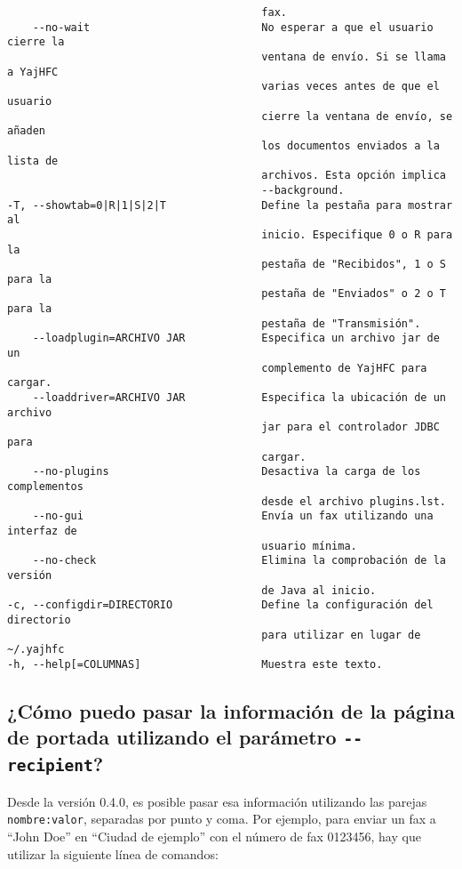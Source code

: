 \documentclass[a4paper,10pt]{scrartcl}
\begin{document}
\begin{verbatim}
                                        fax.
    --no-wait                           No esperar a que el usuario cierre la
                                        ventana de envío. Si se llama a YajHFC
                                        varias veces antes de que el usuario
                                        cierre la ventana de envío, se añaden
                                        los documentos enviados a la lista de
                                        archivos. Esta opción implica
                                        --background.
-T, --showtab=0|R|1|S|2|T               Define la pestaña para mostrar al
                                        inicio. Especifique 0 o R para la
                                        pestaña de "Recibidos", 1 o S para la
                                        pestaña de "Enviados" o 2 o T para la
                                        pestaña de "Transmisión".
    --loadplugin=ARCHIVO JAR            Especifica un archivo jar de un
                                        complemento de YajHFC para cargar.
    --loaddriver=ARCHIVO JAR            Especifica la ubicación de un archivo
                                        jar para el controlador JDBC para
                                        cargar.
    --no-plugins                        Desactiva la carga de los complementos
                                        desde el archivo plugins.lst.
    --no-gui                            Envía un fax utilizando una interfaz de
                                        usuario mínima.
    --no-check                          Elimina la comprobación de la versión
                                        de Java al inicio.
-c, --configdir=DIRECTORIO              Define la configuración del directorio
                                        para utilizar en lugar de ~/.yajhfc
-h, --help[=COLUMNAS]                   Muestra este texto.
\end{verbatim}

\subsection{¿Cómo puedo pasar la información de la página de portada utilizando el parámetro \texttt{-{-}recipient}?}

Desde la versión 0.4.0, es posible pasar esa información utilizando las parejas \texttt{nombre:valor}, separadas por punto y coma. Por ejemplo, para enviar un fax a ``John Doe'' en ``Ciudad de ejemplo'' con el número de fax 0123456, hay que utilizar la siguiente línea de comandos:
\end{document}
